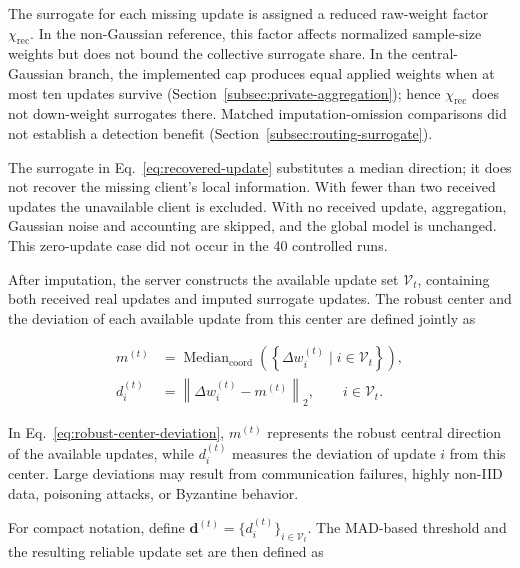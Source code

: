 \documentclass[5p,times,numafflabel]{elsarticle}
\begin{document}
	
	The surrogate for each missing update is assigned a reduced raw-weight
	factor \(\chi_{\mathrm{rec}}\). In the non-Gaussian reference,
	this factor affects normalized sample-size weights but does not
	bound the collective surrogate share. In the central-Gaussian branch,
	the implemented cap produces equal applied weights when at most ten
	updates survive (Section~\ref{subsec:private-aggregation}); hence
	\(\chi_{\mathrm{rec}}\) does not down-weight surrogates there.
	Matched imputation-omission comparisons did not establish a detection
	benefit (Section~\ref{subsec:routing-surrogate}).
	
	
	
	The surrogate in Eq.~\eqref{eq:recovered-update} substitutes a
	median direction; it does not recover the missing client's local
	information. With fewer than two received updates the unavailable
	client is excluded. With no received update, aggregation, Gaussian
	noise and accounting are skipped, and the global model is unchanged.
	This zero-update case did not occur in the 40 controlled runs.
	
	After imputation, the server constructs the available update set
	\(\mathcal{V}_{t}\), containing both received real updates and
	imputed surrogate updates. The robust center and the deviation
	of each available update from this center are defined jointly as
	
	\begin{equation}
		\begin{aligned}
			m^{(t)}
			&=
			\operatorname{Median}_{\mathrm{coord}}
			\left(
			\left\{
			\Delta w_{i}^{(t)}
			\mid i\in\mathcal{V}_{t}
			\right\}
			\right),\\
			d_{i}^{(t)}
			&=
			\left\|
			\Delta w_{i}^{(t)}-m^{(t)}
			\right\|_{2},
			\qquad i\in\mathcal{V}_{t}.
		\end{aligned}
		\label{eq:robust-center-deviation}
	\end{equation}
	
	In Eq.~\eqref{eq:robust-center-deviation}, \(m^{(t)}\) represents
	the robust central direction of the available updates, while
	\(d_i^{(t)}\) measures the deviation of update \(i\) from this
	center. Large deviations may result from communication failures,
	highly non-IID data, poisoning attacks, or Byzantine behavior.
	
	For compact notation, define
	\(\mathbf{d}^{(t)}=\{d_i^{(t)}\}_{i\in\mathcal{V}_{t}}\).
	The MAD-based threshold and the resulting reliable update set are
	then defined as
	
\end{document}
